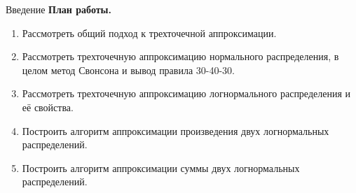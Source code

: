 \documentclass[ucs, notheorems, handout]{beamer}
\begin{document}
	
	\begin{frame}{Введение}
		\textbf{План работы.}
		\begin{enumerate}
			\item Рассмотреть общий подход к трехточечной аппроксимации.
			\item Рассмотреть трехточечную аппроксимацию нормального распределения, в целом метод Свонсона и вывод правила 30-40-30.
			\item Рассмотреть трехточечную аппроксимацию логнормального распределения и её  свойства.
			\item Построить алгоритм аппроксимации произведения двух логнормальных распределений.
			\item Построить алгоритм аппроксимации суммы двух логнормальных распределений.
		\end{enumerate}
		
	\end{frame}
	
\end{document}
